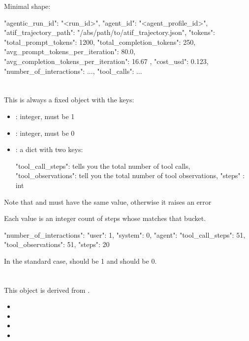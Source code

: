 \documentclass[11pt]{article}
\begin{document}
Minimal shape:


\begin{DocCode}
{
  "agentic_run_id": "<run_id>",
  "agent_id": "<agent_profile_id>",
  "atif_trajectory_path": "/abs/path/to/atif_trajectory.json",
  "tokens": {
    "total_prompt_tokens": 1200,
    "total_completion_tokens": 250,
    "avg_prompt_tokens_per_iteration": 80.0,
    "avg_completion_tokens_per_iteration": 16.67
  },
  "cost_usd": 0.123,
  "number_of_interactions": {...},
  "tool_calls": {...}
}
\end{DocCode}



\section*{}

This is always a fixed object with the keys:
\begin{itemize}
\item {}: integer, must be 1
\item {}: integer, must be 0
\item {}: a dict with two keys:
\begin{DocCode}
{"tool_call_steps": tells you the total number of tool calls, "tool_observations": tell you the total number of tool observations, "steps" : int}
\end{DocCode}
\end{itemize}
Note that  and  must have the same value, otherwise it raises an error

Each value is an integer count of steps whose  matches that bucket.

\begin{DocCode}
"number_of_interactions": {
  "user": 1,
  "system": 0,
  "agent": {"tool_call_steps": 51, "tool_observations": 51, "steps": 20}
}
\end{DocCode}
In the standard case,  should be 1 and  should be 0.

\section*{}

This object is derived from .

\begin{itemize}
\item {}
\item {}
\item {}
\item {}
\end{itemize}
\end{document}
